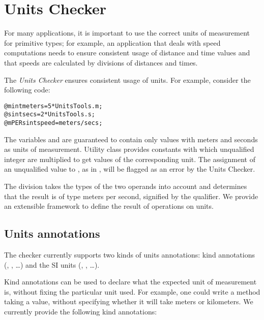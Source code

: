 \htmlhr
\chapter{Units Checker\label{units-checker}}

For many applications, it is important to use the correct units of
measurement for primitive types; for example, an application that
deals with speed computations needs to ensure consistent usage of
distance and time values and that speeds are calculated by divisions
of distances and times.

The \emph{Units Checker} ensures consistent usage of units.
For example, consider the following code:

\begin{alltt}
@m int meters = 5 * UnitsTools.m;
@s int secs = 2 * UnitsTools.s;
@mPERs int speed = meters / secs;
\end{alltt}

The variables  and  are guaranteed to contain
only values with meters and seconds as units of measurement.
Utility class  provides constants with which
unqualified integer are multiplied to get values of the corresponding unit.
The assignment of an unqualified value to , as in
, will be flagged as an error by the Units Checker.

The division  takes the types of the two operands
into account and determines that the result is of type
meters per second, signified by the  qualifier.
We provide an extensible framework to define the result of operations
on units.


\section{Units annotations\label{units-annotations}}

The checker currently supports two kinds of units annotations:
kind annotations (, , \dots) and
the SI units (, , \dots).


Kind annotations can be used to declare what the expected unit of
measurement is, without fixing the particular unit used.
For example, one could write a method taking a  value,
without specifying whether it will take meters or kilometers.
We currently provide the following kind annotations:

